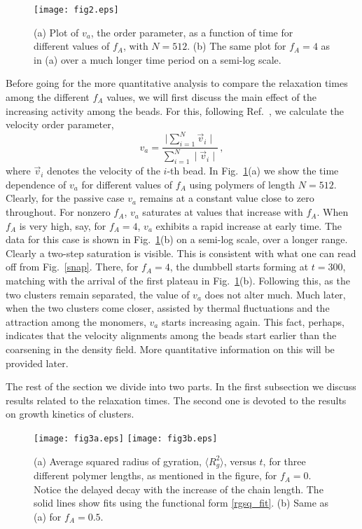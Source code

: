 \documentclass[aps,prx,reprint,showpacs,showkeys,noeprint,longbibliography]{revtex4-1} %
\begin{document}
\begin{figure}[t!]
	\centering
	\texttt{[image: fig2.eps]}
	\caption{\label{opm} (a) Plot of $v_a$, the order parameter, as a function of time for different values of $f_A$, with $N=512$. (b) The same plot
for $f_A=4$ as in (a) over a much longer time period on a semi-log scale.}
\end{figure}
\par
Before going for the more quantitative analysis to compare the relaxation times among the different $f_A$ values, we will first discuss the main effect of the increasing activity among the beads. 
For this, following Ref.~\cite{vicsek}, we calculate the velocity order parameter, 
\begin{equation}\label{opv}
v_a = \frac{\mid\sum\limits_{i=1}^{N} \vec{v}_i\mid}{\sum\limits_{i=1}^{N} \mid\vec{v}_i\mid}\,,
\end{equation}
where $\vec{v}_i$ denotes the velocity of the $i$-th bead. In Fig.~\ref{opm}(a) we show the time dependence of $v_a$ for different values of $f_A$ using polymers of length $N = 512$. Clearly, for the passive case $v_a$ remains at a constant value close to zero throughout. For nonzero $f_A$, $v_a$ saturates at values that increase  with $f_A$. When $f_A$ is very high, say, for $f_A=4$, $v_a$ exhibits a rapid increase at early time. The data for this case is shown in Fig.~\ref{opm}(b) on a semi-log scale, over a longer range. Clearly a two-step saturation is visible. 
This is consistent with what one can read off from Fig.~\ref{snap}. There, for $f_A=4$, the dumbbell starts forming at $t=300$, matching with the arrival of the first plateau in Fig.~\ref{opm}(b). Following this, as the two clusters 
remain separated, the value of $v_a$ does not alter much. Much later, when the two clusters come closer, assisted by thermal fluctuations and the attraction among the monomers, $v_a$ starts increasing again. This fact, perhaps, indicates that the velocity alignments among the beads start earlier than the coarsening in the density field. More quantitative information on this will be provided later.
\par
The rest of the section we divide into two parts. In the first subsection 
we discuss results related to the relaxation times. The second one is devoted to the results on growth kinetics of clusters.
\begin{figure}[b!]
	\centering
	\texttt{[image: fig3a.eps]}
	\vskip 0.4cm
	\texttt{[image: fig3b.eps]}
	\caption{\label{rgsq_decay} (a) Average squared radius of gyration, $\langle R_g^2 \rangle$, versus $t$, for three different polymer lengths, as mentioned in the figure, for $f_A=0$. Notice the delayed decay with the increase of the chain length. The solid lines show fits using the functional form \eqref{rgsq_fit}. (b) Same as (a) for $f_A=0.5$.}
\end{figure}
\end{document}

